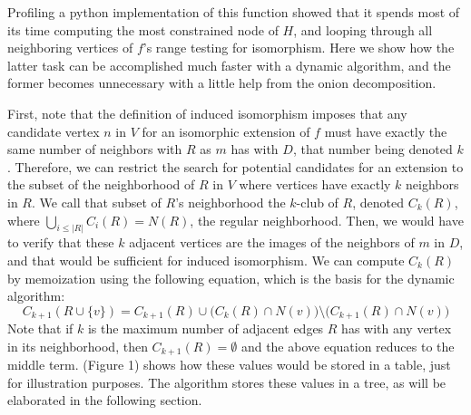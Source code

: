 \documentclass{article}
\begin{document}
    Profiling a python implementation of this function showed that it spends most of its time computing the most constrained node of $H$, and looping through all neighboring vertices of $f$'s range testing for isomorphism. Here we show how the latter task can be accomplished much faster with a dynamic algorithm, and the former becomes unnecessary with a little help from the onion decomposition.
    
    First, note that the definition of induced isomorphism imposes that any candidate vertex $n$ in $V$ for an isomorphic extension of $f$ must have exactly the same number of neighbors with $R$ as $m$ has with $D$, that number being denoted $k$. Therefore, we can restrict the search for potential candidates for an extension to the subset of the neighborhood of $R$ in $V$ where vertices have exactly $k$ neighbors in $R$. We call that subset of $R$'s neighborhood the $k$-club of $R$, denoted $C_k(R)$, where $\displaystyle\bigcup_{i \leq |R|}C_i(R) = N(R)$, the regular neighborhood. Then, we would have to verify that these $k$ adjacent vertices are the images of the neighbors of $m$ in $D$, and that would be sufficient for induced isomorphism. We can compute $C_k(R)$ by memoization using the following equation, which is the basis for the dynamic algorithm:
\begin{equation}
C_{k+1}(R \cup \{v\}) = C_{k+1}(R) \cup \big(C_k(R) \cap N(v)\big) \setminus \big( C_{k+1}(R) \cap N(v)\big)
\end{equation}
    Note that if $k$ is the maximum number of adjacent edges $R$ has with any vertex in its neighborhood, then $C_{k+1}(R) = \emptyset$ and the above equation reduces to the middle term. (Figure 1) shows how these values would be stored in a table, just for illustration purposes. The algorithm stores these values in a tree, as will be elaborated in the following section. 
    
\end{document}
